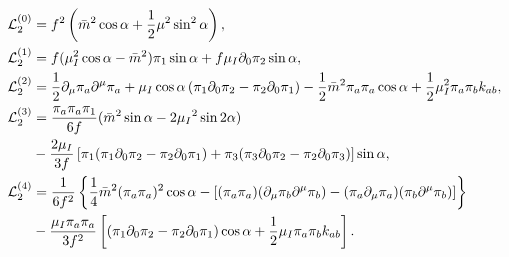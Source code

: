 \begin{align}
\mathcal{L}_2^{(0)}
&  =
    f^2   
    \left(
        \bar m^2 \cos{\alpha}
        + \frac{1}{2} \mu^2 \sin^2{\alpha}
    \right),
    \label{L0}
\\
\label{L1}
\mathcal{L}_2^{(1)}
& =
    f 
    (
        \mu_I^2\cos{\alpha}
        - \bar m^2
    ) \pi_1 \sin{\alpha}
    + f \mu_I \partial_0\pi_2 \sin{\alpha},
\\
\mathcal{L}_2^{(2)}
& =
    \frac{1}{2} \partial_\mu\pi_a\partial^\mu\pi_a
    + \mu_I \cos{\alpha} \left( \pi_1 \partial_0\pi_2 - \pi_2\partial_0\pi_1 \right)
    - \frac{1}{2} \bar m^2 \pi_a \pi_a \cos{\alpha}
    + \frac{1}{2} \mu_I ^2 \pi_a \pi_b k_{ab},
\label{L2}
\\
\notag
\mathcal{L}_2^{(3)}
& =
    \frac{\pi_a\pi_a \pi_1}{6f}
    (\bar m^2 \sin{\alpha}-2\mu_I{}^2 \sin{2\alpha})\\ \label{L3}
    &
    -
    \frac{2 \mu_I}{3 f}
    \left[
        \pi_1(\pi_1 \partial_0\pi_2 - \pi_2\partial_0\pi_1)
        +
        \pi_3(\pi_3\partial_0\pi_2-\pi_2 \partial_0\pi_3)
    \right]
    \sin{\alpha},
\\
\notag
\mathcal{L}_2^{(4)}
& =
\frac{1}{6f^2}
\left\{     
    \frac{1}{4} \bar m^2 (\pi_a\pi_a)^2 \cos{\alpha}
    -
    \left[
        (\pi_a \pi_a) (\partial_\mu \pi_b \partial^\mu \pi_b )
        - (\pi_a \partial_\mu \pi_a)(\pi_b \partial^\mu \pi_b )
    \right]
 \right\}
\\
&
- \frac{\mu_I \pi_a\pi_a}{3f^2}
\left[
    \left(\pi_1\partial_0 \pi_2 - \pi_2 \partial_0 \pi_1\right)
    \cos{\alpha}
    + \frac{1}{2} \mu_I \pi_a \pi_b k_{ab}
\right].
\label{L4}
\end{align}
%
